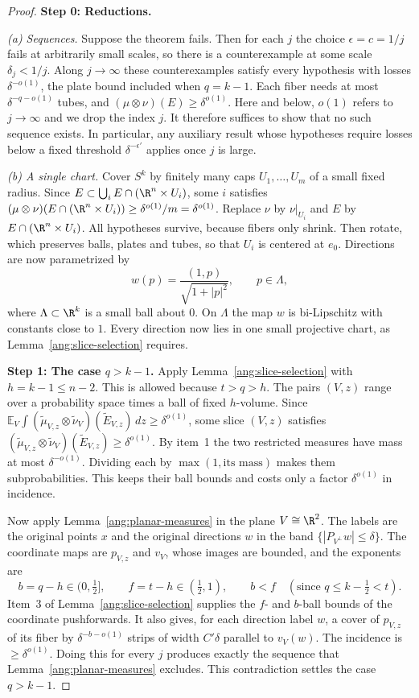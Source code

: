 \begin{proof}
\textbf{Step 0: Reductions.}

\emph{(a) Sequences.} Suppose the theorem fails. Then for each $j$ the choice $\epsilon=c=1/j$ fails at arbitrarily small scales, so there is a counterexample at some scale $\delta_j<1/j$. Along $j\to\infty$ these counterexamples satisfy every hypothesis with losses $\delta^{-o(1)}$, the plate bound included when $q=k-1$. Each fiber needs at most $\delta^{-q-o(1)}$ tubes, and $(\mu\otimes\nu)(E)\ge\delta^{o(1)}$. Here and below, $o(1)$ refers to $j\to\infty$ and we drop the index $j$. It therefore suffices to show that no such sequence exists. In particular, any auxiliary result whose hypotheses require losses below a fixed threshold $\delta^{-\epsilon'}$ applies once $j$ is large.

\emph{(b) A single chart.} Cover $S^k$ by finitely many caps $U_1,\dots,U_m$ of a small fixed radius. Since $E\subset\bigcup_i E\cap(\R^n\times U_i)$, some $i$ satisfies $(\mu\otimes\nu)(E\cap(\R^n\times U_i))\ge\delta^{o(1)}/m=\delta^{o(1)}$. Replace $\nu$ by $\nu|_{U_i}$ and $E$ by $E\cap(\R^n\times U_i)$. All hypotheses survive, because fibers only shrink. Then rotate, which preserves balls, plates and tubes, so that $U_i$ is centered at $e_0$. Directions are now parametrized by
\[
 w(p)=\frac{(1,p)}{\sqrt{1+|p|^2}},\qquad p\in\Lambda,
\]
where $\Lambda\subset\R^k$ is a small ball about $0$. On $\Lambda$ the map $w$ is bi-Lipschitz with constants close to $1$. Every direction now lies in one small projective chart, as Lemma~\ref{ang:slice-selection} requires.

\textbf{Step 1: The case $q>k-1$.} Apply Lemma~\ref{ang:slice-selection} with $h=k-1\le n-2$. This is allowed because $t>q>h$. The pairs $(V,z)$ range over a probability space times a ball of fixed $h$-volume. Since
$\mathbb E_V\!\int(\widetilde\mu_{V,z}\otimes\widetilde\nu_V)(\widetilde E_{V,z})\,dz\ge\delta^{o(1)}$, some slice $(V,z)$ satisfies $(\widetilde\mu_{V,z}\otimes\widetilde\nu_V)(\widetilde E_{V,z})\ge\delta^{o(1)}$. By item~1 the two restricted measures have mass at most $\delta^{-o(1)}$. Dividing each by $\max(1,\text{its mass})$ makes them subprobabilities. This keeps their ball bounds and costs only a factor $\delta^{o(1)}$ in incidence.

Now apply Lemma~\ref{ang:planar-measures} in the plane $V\cong\R^2$. The labels are the original points $x$ and the original directions $w$ in the band $\{|P_{V^\perp}w|\le\delta\}$. The coordinate maps are $p_{V,z}$ and $v_V$, whose images are bounded, and the exponents are
\[
 b=q-h\in(0,\tfrac12],\qquad f=t-h\in(\tfrac12,1),\qquad b<f\quad(\text{since }q\le k-\tfrac12<t).
\]
Item~3 of Lemma~\ref{ang:slice-selection} supplies the $f$- and $b$-ball bounds of the coordinate pushforwards. It also gives, for each direction label $w$, a cover of $p_{V,z}$ of its fiber by $\delta^{-b-o(1)}$ strips of width $C'\delta$ parallel to $v_V(w)$. The incidence is $\ge\delta^{o(1)}$. Doing this for every $j$ produces exactly the sequence that Lemma~\ref{ang:planar-measures} excludes. This contradiction settles the case $q>k-1$.


\end{proof}
